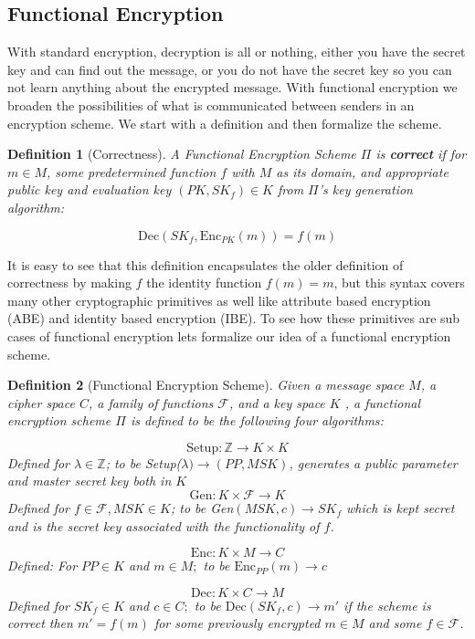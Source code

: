 \documentclass[12pt,twoside]{reedthesis}
\newtheorem{definition}{Definition}
\newcommand{\enc}[0]{\text{Enc}}
\newcommand{\dec}[0]{\text{Dec}}
\newcommand{\Z}[0]{\mathbb{Z}}
\begin{document}
\subsection{Functional Encryption}

With standard encryption, decryption is all or nothing, either you have the secret key and can find out the message, or you do not have the secret key so you can not learn anything about the encrypted message. With functional encryption we broaden the possibilities of what is communicated between senders in an encryption scheme. We start with a definition and then formalize the scheme.
\begin{definition}[Correctness]
A Functional Encryption Scheme $\Pi$ is \textbf{correct} if for $m \in M$, some predetermined function $f$ with $M$ as its domain, and appropriate public key and \textit{evaluation} key $(PK,SK_f)\in K$ from $\Pi$'s key generation algorithm:

$$\dec(SK_f, \enc_{PK}(m)) = f(m) $$
\end{definition}

It is easy to see that this definition encapsulates the older definition of correctness by making $f$ the identity function $f(m) = m$, but this syntax covers many other cryptographic primitives as well like attribute based encryption (ABE) and identity based encryption (IBE). To see how these primitives are sub cases of functional encryption lets formalize our idea of a functional encryption scheme. 




\begin{definition}[Functional Encryption Scheme]
Given a message space $M$, a cipher space $C$, a family of functions $\mathcal{F}$, and a key space $K$ , a functional encryption scheme $\Pi$ is defined to be the following four algorithms:

$$\text{Setup}: \Z \rightarrow K \times K$$
Defined for $\lambda \in \Z$; to be Setup($\lambda) \rightarrow (PP,MSK)$, generates a public parameter and master secret key both in $K$
$$\text{Gen}: K \times \mathcal{F} \rightarrow K $$
Defined for $f \in \mathcal{F}, MSK \in K$; to be Gen$(MSK,c) \rightarrow SK_f$ which is kept secret and is the secret key associated with the functionality of $f$.

$$\enc: K \times M \rightarrow C$$
Defined: For $PP\in K$ and $m \in M;$ to be $\enc_{PP}(m) \rightarrow c$

$$\dec:K \times C \rightarrow M$$
Defined for $SK_f \in K$ and $c \in C;$ to be $\dec(SK_f,c) \rightarrow m'$ if the scheme is correct then $m' = f(m)$ for some previously encrypted $m\in M$ and some $f\in \mathcal{F}$.

\end{definition}
\end{document}
